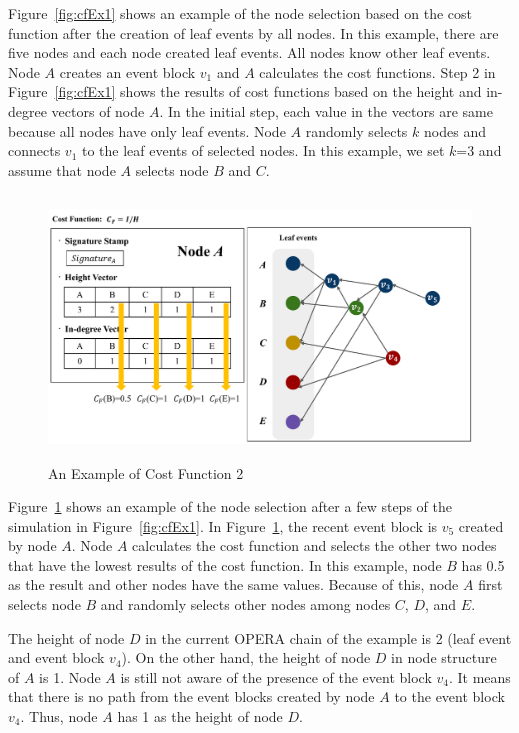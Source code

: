 \documentclass[preprint,12pt]{elsarticle}
\begin{document}
Figure~\ref{fig:cfEx1} shows an example of the node selection based on the cost function after the creation of leaf events by all nodes. In this example, there are five nodes and each node created leaf events. All nodes know other leaf events. Node $A$ creates an event block $v_1$ and $A$ calculates the cost functions. Step 2 in Figure~\ref{fig:cfEx1} shows the results of cost functions based on the height and in-degree vectors of node $A$. In the initial step, each value in the vectors are same because all nodes have only leaf events. Node $A$ randomly selects $k$ nodes and connects $v_1$ to the leaf events of selected nodes. In this example, we set $k$=3 and assume that node $A$ selects node $B$ and $C$. 

\begin{figure} \centering  
	\includegraphics[height=7cm]{fig_cfEx2}
	\caption{An Example of Cost Function 2}
	\label{fig:cfEx2}
\end{figure}

Figure~\ref{fig:cfEx2} shows an example of the node selection after a few steps of the simulation in Figure~\ref{fig:cfEx1}. In Figure~\ref{fig:cfEx2}, the recent event block is $v_5$ created by node $A$. Node $A$ calculates the cost function and selects the other two nodes that have the lowest results of the cost function. In this example, node $B$ has 0.5 as the result and other nodes have the same values. Because of this, node $A$ first selects node $B$ and randomly selects other nodes among nodes $C$, $D$, and $E$.

The height of node $D$ in the current OPERA chain of the example is 2 (leaf event and event block $v_4$). On the other hand, the height of node $D$ in node structure of $A$ is 1. Node $A$ is still not aware of the presence of the event block $v_4$. It means that there is no path from the event blocks created by node $A$ to the event block $v_4$. Thus, node $A$ has 1 as the height of node $D$. 
\end{document}
